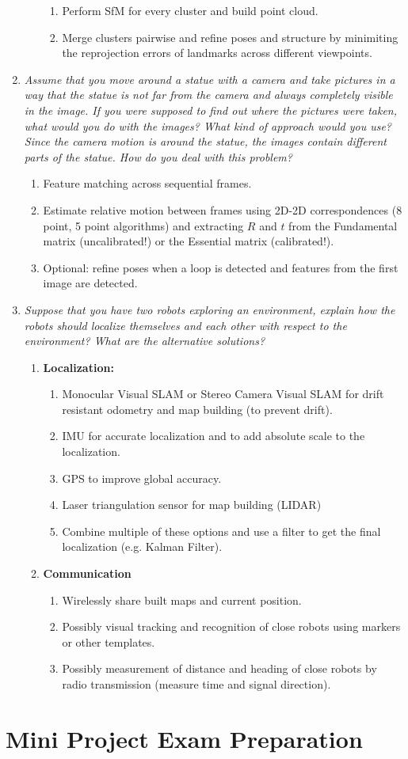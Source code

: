 \documentclass[a4paper,12 pt]{article}
\theoremstyle{definition}
\theoremstyle{remark}
\theoremstyle{definition}
\theoremstyle{definition}
\theoremstyle{definition}
\theoremstyle{definition}
\theoremstyle{remark}
\theoremstyle{remark}
\theoremstyle{definition}
\theoremstyle{definition}
\begin{document}
\begin{enumerate}
\begin{enumerate}
\begin{enumerate}
\item Perform SfM for every cluster and build point cloud.
\item Merge clusters pairwise and refine poses and structure by minimiting the reprojection errors of landmarks across different viewpoints.
\end{enumerate}
\end{enumerate}
\item \textit{Assume that you move around a statue with a camera and take pictures in a way that the statue is not far from the camera and always completely visible in the image. If you were supposed to find out where the pictures were taken, what would you do with the images? What kind of approach would you use? Since the camera motion is around the statue, the images contain different parts of the statue. How do you deal with this problem?}
\begin{enumerate}
\item Feature matching across sequential frames.
\item Estimate relative motion between frames using 2D-2D correspondences (8 point, 5 point algorithms) and extracting $R$ and $t$ from the Fundamental matrix (uncalibrated!) or the Essential matrix (calibrated!).
\item Optional: refine poses when a loop is detected and features from the first image are detected.
\end{enumerate}
\item \textit{Suppose that you have two robots exploring an environment, explain how the robots should localize themselves and each other with respect to the environment? What are the alternative solutions?}
\begin{enumerate}
\item \textbf{Localization:}
\begin{enumerate}
\item Monocular Visual SLAM or Stereo Camera Visual SLAM for drift resistant odometry and map building (to prevent drift).
\item IMU for accurate localization and to add absolute scale to the localization.
\item GPS to improve global accuracy.
\item Laser triangulation sensor for map building (LIDAR)
\item Combine multiple of these options and use a filter to get the final localization (e.g. Kalman Filter).
\end{enumerate}
\item \textbf{Communication}
\begin{enumerate}
\item Wirelessly share built maps and current position.
\item Possibly visual tracking and recognition of close robots using markers or other templates.
\item Possibly measurement of distance and heading of close robots by radio transmission (measure time and signal direction).
\end{enumerate}
\end{enumerate}
\end{enumerate}
\newpage
\section{Mini Project Exam Preparation}
\end{document}
